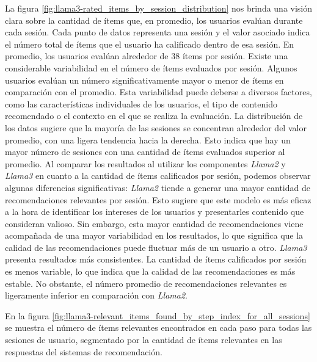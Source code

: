 \documentclass[11pt,a4paper,twoside]{thesis}
\begin{document}
La figura \ref{fig:llama3-rated_items_by_session_distribution} nos brinda una visión clara sobre la cantidad de ítems que, en promedio, los usuarios evalúan durante cada sesión. Cada punto de datos representa una sesión y el valor asociado indica el número total de ítems que el usuario ha calificado dentro de esa sesión. En promedio, los usuarios evalúan alrededor de $38$ ítems por sesión. Existe una considerable variabilidad en el número de ítems evaluados por sesión. Algunos usuarios evalúan un número significativamente mayor o menor de ítems en comparación con el promedio. Esta variabilidad puede deberse a diversos factores, como las características individuales de los usuarios, el tipo de contenido recomendado o el contexto en el que se realiza la evaluación. La distribución de los datos sugiere que la mayoría de las sesiones se concentran alrededor del valor promedio, con una ligera tendencia hacia la derecha. Esto indica que hay un mayor número de sesiones con una cantidad de ítems evaluados superior al promedio. Al comparar los resultados al utilizar los componentes \textit{Llama2} y \textit{Llama3} en cuanto a la cantidad de ítems calificados por sesión, podemos observar algunas diferencias significativas: \textit{Llama2} tiende a generar una mayor cantidad de recomendaciones relevantes por sesión. Esto sugiere que este modelo es más eficaz a la hora de identificar los intereses de los usuarios y presentarles contenido que consideran valioso. Sin embargo, esta mayor cantidad de recomendaciones viene acompañada de una mayor variabilidad en los resultados, lo que significa que la calidad de las recomendaciones puede fluctuar más de un usuario a otro. \textit{Llama3} presenta resultados más consistentes. La cantidad de ítems calificados por sesión es menos variable, lo que indica que la calidad de las recomendaciones es más estable. No obstante, el número promedio de recomendaciones relevantes es ligeramente inferior en comparación con \textit{Llama2}.


\clearpage

En la figura \ref{fig:llama3-relevant_items_found_by_step_index_for_all_sessions} se muestra el número de ítems relevantes encontrados en cada paso para todas las sesiones de usuario, segmentado por la cantidad de ítems relevantes en las
respuestas del sistemas de recomendación.
\end{document}
